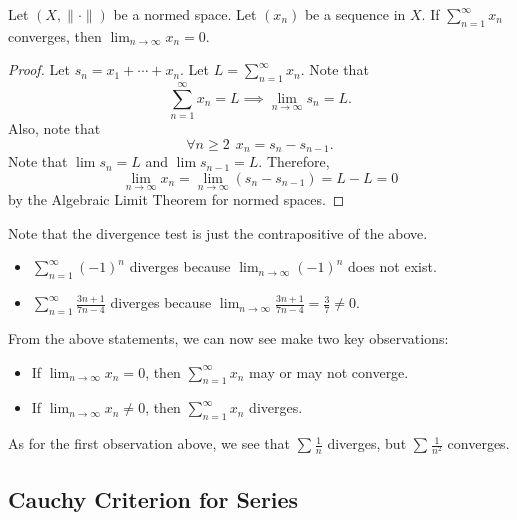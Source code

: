 \documentclass[a4paper]{article}
\begin{document}
\begin{theorem}
   Let \( (X,\|\cdot\|) \) be a normed space. Let \( ({x}_{n}) \) be a sequence in \( X  \). If \( \sum_{ n=1  }^{ \infty  } {x}_{n}  \) converges, then \( \lim_{ n \to \infty  }  {x}_{n} = 0  \). 
\end{theorem}
\begin{proof}
Let \( {s}_{n} = {x}_{1} + \cdots + {x}_{n} \). Let \( L = \sum_{ n=1  }^{ \infty  } {x}_{n} \). Note that 
\[  \sum_{ n=1  }^{ \infty  } {x}_{n} = L \implies \lim_{ n \to \infty  }  {s}_{n} = L.  \]
Also, note that 
\[  \forall n \geq 2 \ \ {x}_{n} = {s}_{n} - {s}_{n-1}. \]
Note that \( \lim {s}_{n} = L  \) and \( \lim {s}_{n-1} = L  \). Therefore, 
\[  \lim_{ n \to \infty  }  {x}_{n} = \lim_{ n \to \infty  }  ({s}_{n} - {s}_{n-1}) = L - L =  0  \]
by the Algebraic Limit Theorem for normed spaces.
\end{proof}
\begin{remark}
    Note that the divergence test is just the contrapositive of the above.
\end{remark}

\begin{eg}
    \begin{itemize}
        \item \( \sum_{ n=1  }^{ \infty  } (-1)^{n} \) diverges because \( \lim_{ n \to \infty  }  (-1)^{n} \) does not exist.
        \item \( \sum_{ n=1  }^{ \infty  } \frac{ 3n+1 }{ 7n-4 }  \) diverges because \( \lim_{ n \to \infty  }  \frac{ 3n + 1 }{ 7 n - 4  }  = \frac{ 3 }{ 7 } \neq 0  \).
    \end{itemize}
\end{eg}

From the above statements, we can now see make two key observations:

\begin{itemize}
    \item If \( \lim_{ n \to \infty  }  {x}_{n} = 0  \), then \( \sum_{ n=1  }^{ \infty  } {x}_{n} \) may or may not converge.
    \item If \( \lim_{ n \to \infty  }  {x}_{n} \neq 0  \), then \( \sum_{ n=1  }^{ \infty  } {x}_{n}  \) diverges.
\end{itemize}

As for the first observation above, we see that \( \sum_{  }^{  } \frac{ 1 }{ n }  \) diverges, but \( \sum_{   }^{  } \frac{ 1 }{ n^{2} }   \) converges.

\subsection{Cauchy Criterion for Series}\label{Cauchy Criterion for Series}
\end{document}
